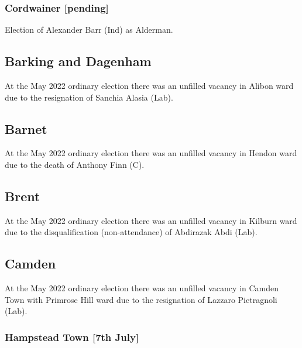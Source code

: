 \documentclass[a4paper,openany]{book}
\begin{document}
\begin{resultsiii}
\subsubsection*{Cordwainer \hspace*{\fill}\nolinebreak[1]%
	\enspace\hspace*{\fill}
	[pending]}


Election of Alexander Barr (Ind) as Alderman.

\subsection*{Barking and Dagenham}

At the May 2022 ordinary election there was an unfilled vacancy in Alibon ward due to the resignation of Sanchia Alasia (Lab).%

\subsection*{Barnet}

At the May 2022 ordinary election there was an unfilled vacancy in Hendon ward due to the death of Anthony Finn (C).%

\subsection*{Brent}

At the May 2022 ordinary election there was an unfilled vacancy in Kilburn ward due to the disqualification (non-attendance) of Abdirazak Abdi (Lab).%

\subsection*{Camden}

At the May 2022 ordinary election there was an unfilled vacancy in Camden Town with Primrose Hill ward due to the resignation of Lazzaro Pietragnoli (Lab).%

\subsubsection*{Hampstead Town \hspace*{\fill}\nolinebreak[1]%
	\enspace\hspace*{\fill}
	[7th July]}


\end{resultsiii}
\end{document}
